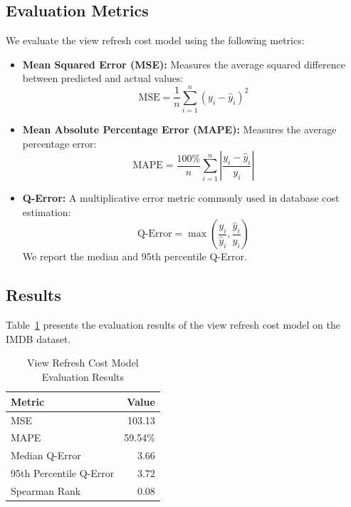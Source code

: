 \subsection{Evaluation Metrics}
\label{sec:cost_model_metrics}

We evaluate the view refresh cost model using the following metrics:

\begin{itemize}
    \item \textbf{Mean Squared Error (MSE):} Measures the average squared difference between predicted and actual values:
    \[
    \text{MSE} = \frac{1}{n} \sum_{i=1}^{n} (y_i - \hat{y}_i)^2
    \]
    
    \item \textbf{Mean Absolute Percentage Error (MAPE):} Measures the average percentage error:
    \[
    \text{MAPE} = \frac{100\%}{n} \sum_{i=1}^{n} \left| \frac{y_i - \hat{y}_i}{y_i} \right|
    \]
    
    \item \textbf{Q-Error:} A multiplicative error metric commonly used in database cost estimation:
    \[
    \text{Q-Error} = \max\left(\frac{y_i}{\hat{y}_i}, \frac{\hat{y}_i}{y_i}\right)
    \]
    We report the median and 95th percentile Q-Error.
\end{itemize}

\subsection{Results}
\label{sec:cost_model_results}

Table~\ref{tab:cost_model_results} presents the evaluation results of the view refresh cost model on the IMDB dataset.

\begin{table}[h!]
    \centering
    \caption{View Refresh Cost Model Evaluation Results}
    \label{tab:cost_model_results}
    \begin{tabular}{lr}
        \toprule
        \textbf{Metric} & \textbf{Value} \\
        \midrule
        MSE & 103.13 \\
        MAPE & 59.54\% \\
        Median Q-Error & 3.66 \\
        95th Percentile Q-Error & 3.72 \\
        Spearman Rank & 0.08 \\
        \bottomrule
    \end{tabular}
\end{table}

